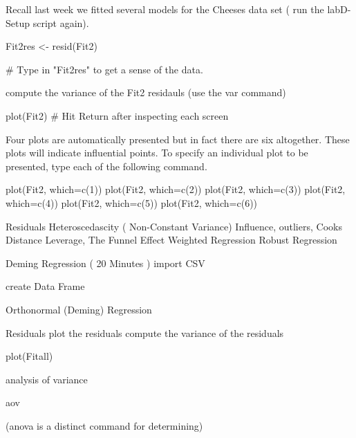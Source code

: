 Recall last week we fitted several models for the Cheeses data set ( run the labD-Setup script again).

Fit2res <- resid(Fit2)

#  Type in "Fit2res" to get a sense of the data.

compute the variance of the Fit2 residauls (use the var command)

plot(Fit2) 
# Hit Return after inspecting each screen

Four plots are automatically presented but in fact there are six altogether. 
These plots will indicate influential points. 
To specify an individual plot to be presented, type each of the following command.


plot(Fit2, which=c(1)) 
plot(Fit2, which=c(2)) 
plot(Fit2, which=c(3)) 
plot(Fit2, which=c(4)) 
plot(Fit2, which=c(5)) 
plot(Fit2, which=c(6)) 

Residuals
Heteroscedascity ( Non-Constant Variance)
Influence, outliers, Cooks Distance Leverage,
The Funnel Effect
Weighted Regression
Robust Regression

Deming Regression ( 20 Minutes )
import CSV

create Data Frame

Orthonormal (Deming) Regression

Residuals
plot the residuals
compute the variance of the residuals

plot(Fitall)


analysis of variance

aov

(anova is a distinct command for determining)
